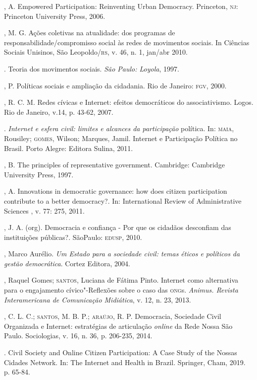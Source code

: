 \begin{bibliohedra}
, A. Empowered Participation: Reinventing Urban Democracy.
Princeton, \textsc{nj}: Princeton University Press, 2006.

, M. G. Ações coletivas na atualidade: dos programas de
responsabilidade/compromisso social às redes de movimentos sociais. In
Ciências Sociais Unisinos, São Leopoldo/\textsc{rs}, v. 46, n. 1, jan/abr 2010.

\titidem. Teoria dos movimentos sociais. \emph{São Paulo:
Loyola}, 1997.

, P. Políticas sociais e ampliação da cidadania. Rio de Janeiro:
\textsc{fgv}, 2000.

, R. C. M. Redes cívicas e Internet: efeitos democráticos do
associativismo. Logos. Rio de Janeiro, v.14, p. 43-62, 2007.

\titidem. \emph{Internet e esfera civil: limites e alcances da
participação} política. In: \textsc{maia}, Rousiley; \textsc{gomes}, Wilson; Marques,
Jamil. Internet e Participação Política no Brasil. Porto Alegre: Editora
Sulina, 2011.

, B. The principles of representative government. Cambridge:
Cambridge University Press, 1997.

, A. Innovations in democratic governance: how does citizen
participation contribute to a better democracy?. In: International
Review of Administrative Sciences , v. 77: 275, 2011.

, J. A. (org). Democracia e confiança - Por que os cidadãos
desconfiam das instituições públicas?. SãoPaulo: \textsc{edusp}, 2010.

, Marco Aurélio. \emph{Um Estado para a sociedade civil: temas
éticos e políticos da gestão democrática}. Cortez Editora, 2004.

, Raquel Gomes; \textsc{santos}, Luciana de Fátima Pinto. Internet como
alternativa para o engajamento cívico"-Reflexões sobre o caso das \textsc{ong}s.
\emph{Animus. Revista Interamericana de Comunicação Midiática}, v. 12,
n. 23, 2013.

, C. L. C.; \textsc{santos}, M. B. P.; \textsc{araújo}, R. P. Democracia,
Sociedade Civil Organizada e Internet: estratégias de articulação \emph{\emph{online}}
da Rede Nossa São Paulo. Sociologias, v. 16, n. 36, p. 206-235, 2014.

\titidem. Civil Society and Online Citizen Participation:
A Case Study of the Nossas Cidades Network. In: The Internet and Health
in Brazil. Springer, Cham, 2019. p. 65-84.


\end{bibliohedra}
